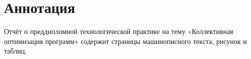 \section*{Аннотация}
Отчёт о преддипломной технологической практике на тему «Коллективная оптимизация программ» содержит  страницы машинописного текста,  рисунок и  таблиц. 
{}